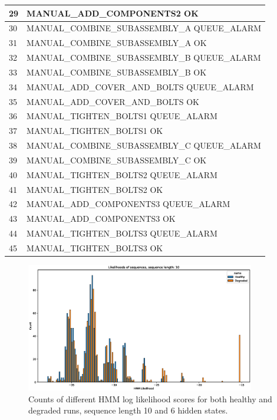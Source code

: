 \documentclass[journal]{IEEEtran}
\begin{document}
\begin{table}[!t]
\begin{tabular}{|p{5mm}|p{55mm}|}
29 & MANUAL\_ADD\_COMPONENTS2 OK \\
\hline
30 & MANUAL\_COMBINE\_SUBASSEMBLY\_A QUEUE\_ALARM \\
\hline
31 & MANUAL\_COMBINE\_SUBASSEMBLY\_A OK \\
\hline
32 & MANUAL\_COMBINE\_SUBASSEMBLY\_B QUEUE\_ALARM \\
\hline
33 & MANUAL\_COMBINE\_SUBASSEMBLY\_B OK \\
\hline
34 & MANUAL\_ADD\_COVER\_AND\_BOLTS QUEUE\_ALARM \\
\hline
35 & MANUAL\_ADD\_COVER\_AND\_BOLTS OK \\
\hline
36 & MANUAL\_TIGHTEN\_BOLTS1 QUEUE\_ALARM \\
\hline
37 & MANUAL\_TIGHTEN\_BOLTS1 OK \\
\hline
38 & MANUAL\_COMBINE\_SUBASSEMBLY\_C QUEUE\_ALARM \\
\hline
39 & MANUAL\_COMBINE\_SUBASSEMBLY\_C OK \\
\hline
40 & MANUAL\_TIGHTEN\_BOLTS2 QUEUE\_ALARM \\
\hline
41 & MANUAL\_TIGHTEN\_BOLTS2 OK \\
\hline
42 & MANUAL\_ADD\_COMPONENTS3 QUEUE\_ALARM \\
\hline
43 & MANUAL\_ADD\_COMPONENTS3 OK \\
\hline
44 & MANUAL\_TIGHTEN\_BOLTS3 QUEUE\_ALARM \\
\hline
45 & MANUAL\_TIGHTEN\_BOLTS3 OK \\
\hline
\end{tabular}
\end{table}

\begin{figure}[tb]
 \centering
 \includegraphics[width=10cm,keepaspectratio=true]{./hmm_histograms_10.eps}
 \caption{Counts of different HMM log likelihood scores for both healthy and degraded runs, sequence length 10 and 6 hidden states.}
 \label{figure:log_likelihood_10}
\end{figure}
\end{document}

